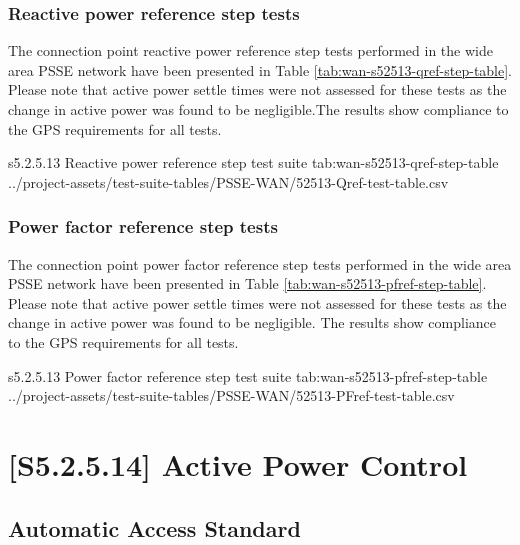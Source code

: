 \documentclass{../grid-link-report}
\newcommand{\projectassetsdir}{../project-assets}
\begin{document}
	
	\subsubsection{Reactive power reference step tests}
	
	The connection point reactive power reference step tests performed in the wide area PSSE network have been presented in Table \ref{tab:wan-s52513-qref-step-table}. Please note that active power settle times were not assessed for these tests as the change in active power was found to be negligible.The results show compliance to the GPS requirements for all tests.




	
	{
		\fontsize{6}{8}\selectfont
		\autoscaledlongtable
		{s5.2.5.13 Reactive power reference step test suite}
		{tab:wan-s52513-qref-step-table}
		{\projectassetsdir/test-suite-tables/PSSE-WAN/52513-Qref-test-table.csv}
	}



	
	\subsubsection{Power factor reference step tests}
	
	The connection point power factor reference step tests performed in the wide area PSSE network have been presented in Table \ref{tab:wan-s52513-pfref-step-table}. Please note that active power settle times were not assessed for these tests as the change in active power was found to be negligible. The results show compliance to the GPS requirements for all tests.
	

	
	{
		\fontsize{6}{8}\selectfont
		\autoscaledlongtable
		{s5.2.5.13 Power factor reference step test suite}
		{tab:wan-s52513-pfref-step-table}
		{\projectassetsdir/test-suite-tables/PSSE-WAN/52513-PFref-test-table.csv}
	}
	

	
	
	\section{[S5.2.5.14] Active Power Control}
	\subsection{Automatic Access Standard}
	\begin{tcolorbox}[lightgreenbox]
		
	\end{tcolorbox}
\end{document}

